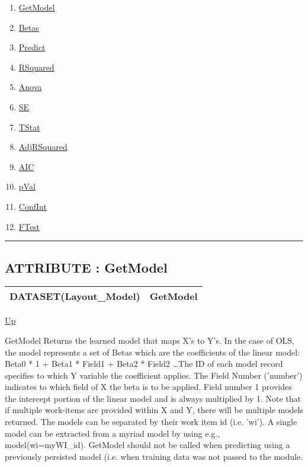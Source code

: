 \begin{enumerate}
\item \hyperlink{ecldoc:linearregression.ols.getmodel}{GetModel}
\item \hyperlink{ecldoc:linearregression.ols.betas}{Betas}
\item \hyperlink{ecldoc:linearregression.ols.predict}{Predict}
\item \hyperlink{ecldoc:linearregression.ols.rsquared}{RSquared}
\item \hyperlink{ecldoc:linearregression.ols.anova}{Anova}
\item \hyperlink{ecldoc:linearregression.ols.se}{SE}
\item \hyperlink{ecldoc:linearregression.ols.tstat}{TStat}
\item \hyperlink{ecldoc:linearregression.ols.adjrsquared}{AdjRSquared}
\item \hyperlink{ecldoc:linearregression.ols.aic}{AIC}
\item \hyperlink{ecldoc:linearregression.ols.pval}{pVal}
\item \hyperlink{ecldoc:linearregression.ols.confint}{ConfInt}
\item \hyperlink{ecldoc:linearregression.ols.ftest}{FTest}
\end{enumerate}

\rule{\textwidth}{0.4pt}

\subsection*{ATTRIBUTE : GetModel}
\hypertarget{ecldoc:linearregression.ols.getmodel}{}

{\renewcommand{\arraystretch}{1.5}
\begin{tabularx}{\textwidth}{|>{\raggedright\arraybackslash}l|X|}
\hline
\hspace{0pt}DATASET(Layout\_Model) & GetModel \\
\hline
\end{tabularx}
}

\hyperlink{ecldoc:linearregression.ols}{Up}

\par
GetModel Returns the learned model that maps X's to Y's. In the case of OLS, the model represents a set of Betas which are the coefficients of the linear model: Beta0 * 1 + Beta1 * Field1 + Beta2 * Field2 \ldots The ID of each model record specifies to which Y variable the coefficient applies. The Field Number ('number') indicates to which field of X the beta is to be applied. Field number 1 provides the intercept portion of the linear model and is always multiplied by 1. Note that if multiple work-items are provided within X and Y, there will be multiple models returned. The models can be separated by their work item id (i.e. 'wi'). A single model can be extracted from a myriad model by using e.g., model(wi=myWI\_id). GetModel should not be called when predicting using a previously persisted model (i.e. when training data was not passed to the module.

